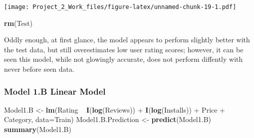 \documentclass[]{article}
\newenvironment{Shaded}{\begin{snugshade}}{\end{snugshade}}
\newcommand{\KeywordTok}[1]{\textcolor[rgb]{0.13,0.29,0.53}{\textbf{{#1}}}}
\newcommand{\DataTypeTok}[1]{\textcolor[rgb]{0.13,0.29,0.53}{{#1}}}
\newcommand{\StringTok}[1]{\textcolor[rgb]{0.31,0.60,0.02}{{#1}}}
\newcommand{\NormalTok}[1]{{#1}}
\begin{document}
\texttt{[image: Project\_2\_Work\_files/figure-latex/unnamed-chunk-19-1.pdf]}

\begin{Shaded}
\begin{Highlighting}[]
\KeywordTok{rm}\NormalTok{(Test)}
\end{Highlighting}
\end{Shaded}

Oddly enough, at first glance, the model appears to perform slightly
better with the test data, but still overestimates low user rating
scores; however, it can be seen this model, while not glowingly
accurate, does not perform diffently with never before seen data.

\subsubsection{Model 1.B Linear Model}\label{model-1.b-linear-model}

\begin{Shaded}
\begin{Highlighting}[]
\NormalTok{Model1.B <-}\StringTok{ }\KeywordTok{lm}\NormalTok{(Rating ~}\StringTok{ }\KeywordTok{I}\NormalTok{(}\KeywordTok{log}\NormalTok{(Reviews)) +}\StringTok{ }\KeywordTok{I}\NormalTok{(}\KeywordTok{log}\NormalTok{(Installs)) +}\StringTok{ }\NormalTok{Price +}\StringTok{ }\NormalTok{Category, }\DataTypeTok{data=}\NormalTok{Train)}
\NormalTok{Model1.B.Prediction <-}\StringTok{ }\KeywordTok{predict}\NormalTok{(Model1.B)}
\KeywordTok{summary}\NormalTok{(Model1.B)}
\end{Highlighting}
\end{Shaded}
\end{document}
